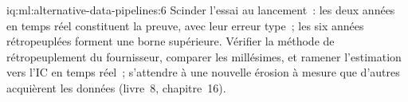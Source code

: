 \begin{solution}{iq:ml:alternative-data-pipelines:6}
Scinder l'essai au lancement~: les deux années en temps réel constituent la preuve, avec leur erreur type~; les six années rétropeuplées forment une borne supérieure.
Vérifier la méthode de rétropeuplement du fournisseur, comparer les millésimes, et ramener l'estimation vers l'IC en temps réel~; s'attendre
à une nouvelle érosion à mesure que d'autres acquièrent les données (livre~8, chapitre~16).
\end{solution}
